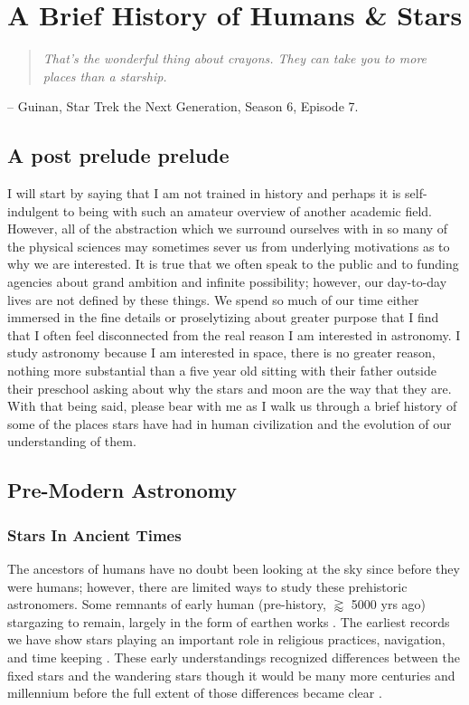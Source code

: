 \chapter{A Brief History of Humans \& Stars}
\begin{quote}\em
  That's the wonderful thing about crayons. They can take you to more places than a starship.
\end{quote}
\begin{flushright}
-- Guinan, Star Trek the Next Generation, Season 6, Episode 7.
\end{flushright}
\section{A post prelude prelude}
I will start by saying that I am not trained in history and perhaps it is
self-indulgent to being with such an amateur overview of another academic
field. However, all of the abstraction which we surround ourselves with in so
many of the physical sciences may sometimes sever us from underlying
motivations as to why we are interested. It is true that we often speak to the
public and to funding agencies about grand ambition and infinite possibility;
however, our day-to-day lives are not defined by these things. We spend so much
of our time either immersed in the fine details or proselytizing about greater
purpose that I find that I often feel disconnected from the real reason I am
interested in astronomy. I study astronomy because I am interested in space,
there is no greater reason, nothing more substantial than a five year old
sitting with their father outside their preschool asking about why the stars
and moon are the way that they are. With that being said, please bear with me
as I walk us through a brief history of some of the places stars have had in
human civilization and the evolution of our understanding of them.

\section{Pre-Modern Astronomy}
\subsection{Stars In Ancient Times}
The ancestors of humans have no doubt been looking at the sky since before they
were humans; however, there are limited ways to study these prehistoric
astronomers. Some remnants of early human (pre-history, $\gtrapprox$ 5000 yrs
ago) stargazing to remain, largely in the form of earthen works \addcite. The
earliest records we have show stars playing an important role in religious
practices, navigation, and time keeping \addcite. These early understandings
recognized differences between the fixed stars and the wandering stars though
it would be many more centuries and millennium before the full extent of those
differences became clear \addcite.

